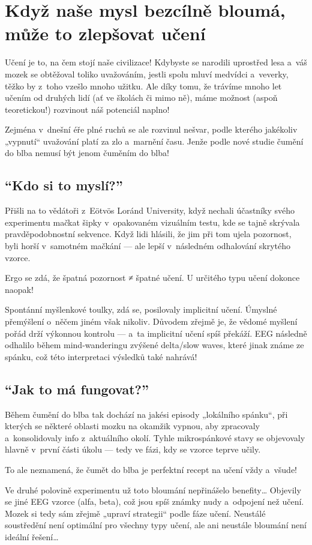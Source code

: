 \documentclass[main.tex]{subfiles}
\begin{document}
\section{Když naše mysl bezcílně bloumá, může to zlepšovat učení}
Učení je to, na čem stojí naše civilizace! Kdybyste se narodili uprostřed lesa a~váš mozek se obtěžoval toliko uvažováním, jestli spolu mluví medvídci a~veverky, těžko by z~toho vzešlo mnoho užitku. Ale díky tomu, že trávíme mnoho let učením od druhých lidí (ať ve školách či mimo ně), máme možnost (aspoň teoretickou!) rozvinout náš potenciál naplno!\par
Zejména v~dnešní éře plné ruchů se ale rozvinul nešvar, podle kterého jakékoliv „vypnutí“ uvažování platí za zlo a~marnění času. Jenže podle nové studie čumění do blba nemusí být jenom čuměním do blba!
\subsection*{\enquote{Kdo si to myslí?}}
Přišli na to vědátoři z~Eötvös Loránd University, když nechali účastníky svého experimentu mačkat šipky v~opakovaném vizuálním testu, kde se tajně skrývala pravděpodobnostní sekvence. Když lidi hlásili, že jim při tom ujela pozornost, byli horší v~samotném mačkání — ale lepší v~následném odhalování skrytého vzorce.\par
Ergo se zdá, že špatná pozornost ≠ špatné učení. U určitého typu učení dokonce naopak!\par
Spontánní myšlenkové toulky, zdá se, posilovaly implicitní učení. Úmyslné přemýšlení o~něčem jiném však nikoliv. Důvodem zřejmě je, že vědomé myšlení pořád drží výkonnou kontrolu — a~ta implicitní učení spíš překáží. EEG následně odhalilo během mind-wanderingu zvýšené delta/slow waves, které jinak známe ze spánku, což této interpretaci výsledků také nahrává!
\subsection*{\enquote{Jak to má fungovat?}}
Během čumění do blba tak dochází na jakési episody „lokálního spánku“, při kterých se některé oblasti mozku na okamžik vypnou, aby zpracovaly a~konsolidovaly info z~aktuálního okolí. Tyhle mikrospánkové stavy se objevovaly hlavně v~první části úkolu — tedy ve fázi, kdy se vzorce teprve učily.\par
To ale neznamená, že čumět do blba je perfektní recept na učení vždy a~všude!\par
Ve druhé polovině experimentu už toto bloumání nepřinášelo benefity… Objevily se jiné EEG vzorce (alfa, beta), což jsou spíš známky nudy a~odpojení než učení. Mozek si tedy sám zřejmě „upraví strategii“ podle fáze učení. Neustálé soustředění není optimální pro všechny typy učení, ale ani neustále bloumání není ideální řešení…
\end{document}
